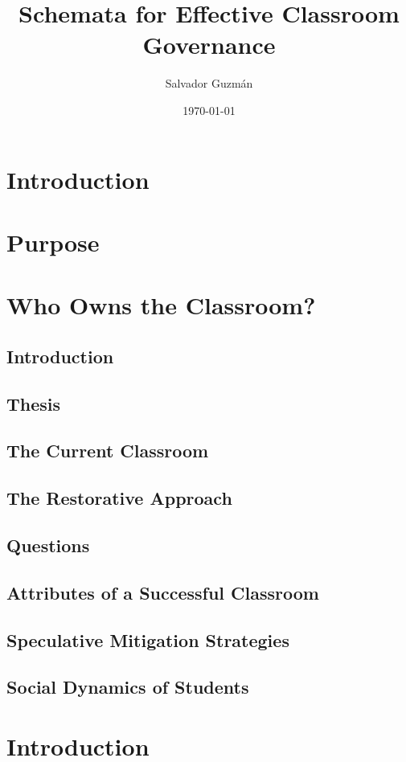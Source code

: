 \documentclass[12pt]{article}
\author{Salvador Guzm\'{a}n}
\date{\today}
\title{Schemata for Effective Classroom Governance}
\begin{document}
  \maketitle
  \pagebreak
  \tableofcontents
  \pagebreak

  \section{Introduction}
  \section{Purpose}

  \section{Who Owns the Classroom?}
  \subsection{Introduction}
  \subsection{Thesis}
  \subsection{The Current Classroom}
  \subsection{The Restorative Approach}
  \subsection{Questions}
  \subsection{Attributes of a Successful Classroom}
  \subsection{Speculative Mitigation Strategies}
  \subsection{Social Dynamics of Students}

  \section{Introduction}
\end{document}
